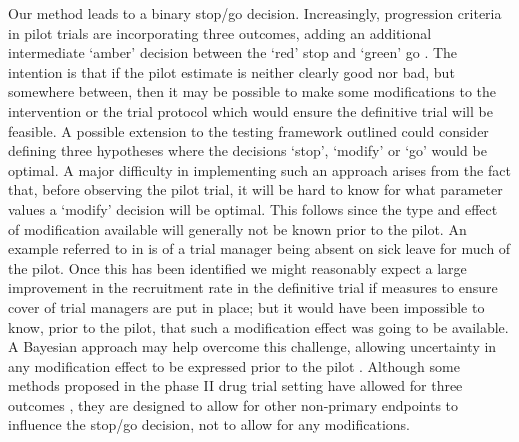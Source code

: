 \documentclass[AMA,STIX1COL]{WileyNJD-v2}
\begin{document}
Our method leads to a binary stop/go decision. Increasingly, progression criteria in pilot trials are incorporating three outcomes, adding an additional intermediate `amber' decision between the `red' stop and `green' go \cite{Avery2017}. The intention is that if the pilot estimate is neither clearly good nor bad, but somewhere between, then it may be possible to make some modifications to the intervention or the trial protocol which would ensure the definitive trial will be feasible. A possible extension to the testing framework outlined could consider defining three hypotheses where the decisions `stop', `modify' or `go' would be optimal. A major difficulty in implementing such an approach arises from the fact that, before observing the pilot trial, it will be hard to know for what parameter values a `modify' decision will be optimal. This follows since the type and effect of modification available will generally not be known prior to the pilot. An example referred to in \cite{Avery2017} is of a trial manager being absent on sick leave for much of the pilot. Once this has been identified we might reasonably expect a large improvement in the recruitment rate in the definitive trial if measures to ensure cover of trial managers are put in place; but it would have been impossible to know, prior to the pilot, that such a modification effect was going to be available. A Bayesian approach may help overcome this challenge, allowing uncertainty in any modification effect to be expressed prior to the pilot \cite{Hampson2017}. Although some methods proposed in the phase II drug trial setting have allowed for three outcomes \cite{Storer1992, Sargent2001, Hong2007}, they are designed to allow for other non-primary endpoints to influence the stop/go decision, not to allow for any modifications.
\end{document}
